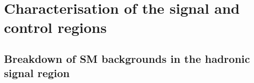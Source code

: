 \section{Characterisation of the signal and control regions}
\label{sec:yields}

%

\subsection{Breakdown of SM backgrounds in the hadronic signal
  region\label{sec:bkgd-comp}}

